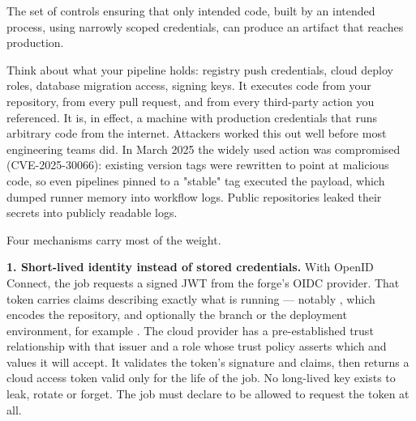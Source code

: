 
 The set of controls ensuring that only intended code, built by an intended process, using narrowly scoped credentials, can produce an artifact that reaches production.

 Think about what your pipeline holds: registry push credentials, cloud deploy roles, database migration access, signing keys. It executes code from your repository, from every pull request, and from every third-party action you referenced. It is, in effect, a machine with production credentials that runs arbitrary code from the internet. Attackers worked this out well before most engineering teams did. In March 2025 the widely used  action was compromised (CVE-2025-30066): existing version tags were rewritten to point at malicious code, so even pipelines pinned to a "stable" tag executed the payload, which dumped runner memory into workflow logs. Public repositories leaked their secrets into publicly readable logs.

 Four mechanisms carry most of the weight.

\textbf{1. Short-lived identity instead of stored credentials.} With OpenID Connect, the job requests a signed JWT from the forge's OIDC provider. That token carries claims describing exactly what is running --- notably , which encodes the repository, and optionally the branch or the deployment environment, for example . The cloud provider has a pre-established trust relationship with that issuer and a role whose trust policy asserts which  and  values it will accept. It validates the token's signature and claims, then returns a cloud access token valid only for the life of the job. No long-lived key exists to leak, rotate or forget. The job must declare  to be allowed to request the token at all.

